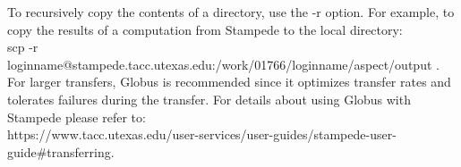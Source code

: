 \documentclass[11pt]{article}
\begin{document}
To recursively copy the contents of a directory, use the -r option. For example, to copy the results of a computation from Stampede to the local directory: \\

scp -r loginname@stampede.tacc.utexas.edu:/work/01766/loginname/aspect/output . \\

For larger transfers, Globus is recommended since it optimizes transfer rates and tolerates
failures during the transfer. For details about using Globus with Stampede please refer to: \\

https://www.tacc.utexas.edu/user-services/user-guides/stampede-user-guide\#transferring.
 

 
\end{document}
